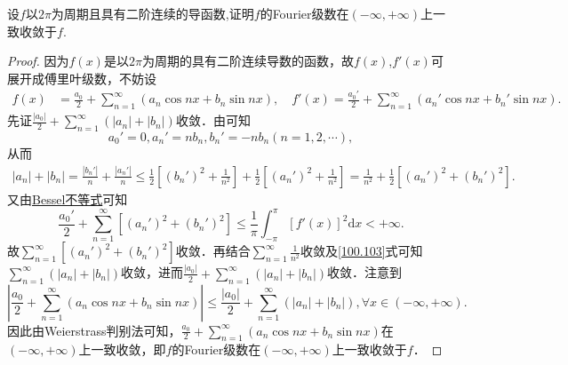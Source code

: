 \documentclass[../../main.tex]{subfiles}
\begin{document}
\begin{example}
设$f$以$2\pi$为周期且具有二阶连续的导函数,证明$f$的Fourier级数在$(-\infty,+\infty)$上一致收敛于$f$.
\end{example}
\begin{proof}
因为$f(x)$是以$2\pi$为周期的具有二阶连续导数的函数，故$f(x)$,$f'(x)$可展开成傅里叶级数，不妨设
\begin{align*}
f(x) &=\frac{a_0}{2}+\sum_{n=1}^{\infty}(a_n\cos nx+b_n\sin nx),\quad f'(x)=\frac{a_{0}'}{2}+\sum_{n=1}^{\infty}(a_{n}'\cos nx+b_{n}'\sin nx).
\end{align*}
先证$\frac{|a_0|}{2}+\sum_{n=1}^{\infty}(|a_n|+|b_n|)$收敛．由可知
$$a_{0}'=0,a_{n}'=nb_n,b_{n}'=-nb_n(n=1,2,\cdots),$$
从而
\begin{align}
|a_n|+|b_n|=\frac{|b_{n}'|}{n}+\frac{|a_{n}'|}{n}\leqslant \frac{1}{2}\left[(b_{n}')^2+\frac{1}{n^2}\right]+\frac{1}{2}\left[(a_{n}')^2+\frac{1}{n^2}\right]
=\frac{1}{n^2}+\frac{1}{2}\left[(a_{n}')^2+(b_{n}')^2\right].\label{100.103}
\end{align}
又由\hyperref[theorem:Bessel不等式]{Bessel不等式}可知
$$\frac{a_{0}'}{2}+\sum_{n=1}^{\infty}\left[(a_{n}')^2+(b_{n}')^2\right]\leqslant \frac{1}{\pi}\int_{-\pi}^{\pi}[f'(x)]^2\mathrm{d}x<+\infty.$$
故$\sum_{n=1}^{\infty}\left[(a_{n}')^2+(b_{n}')^2\right]$收敛．再结合$\sum_{n=1}^{\infty}\frac{1}{n^2}$收敛及\eqref{100.103}式可知$\sum_{n=1}^{\infty}(|a_n|+|b_n|)$收敛，进而$\frac{|a_0|}{2}+\sum_{n=1}^{\infty}(|a_n|+|b_n|)$收敛．注意到
$$\left|\frac{a_0}{2}+\sum_{n=1}^{\infty}(a_n\cos nx+b_n\sin nx)\right|\leqslant \frac{|a_0|}{2}+\sum_{n=1}^{\infty}(|a_n|+|b_n|),\forall x\in(-\infty,+\infty).$$
因此由Weierstrass判别法可知，$\frac{a_0}{2}+\sum_{n=1}^{\infty}(a_n\cos nx+b_n\sin nx)$在$(-\infty,+\infty)$上一致收敛，即$f$的Fourier级数在$(-\infty,+\infty)$上一致收敛于$f$．

\end{proof}
\end{document}
